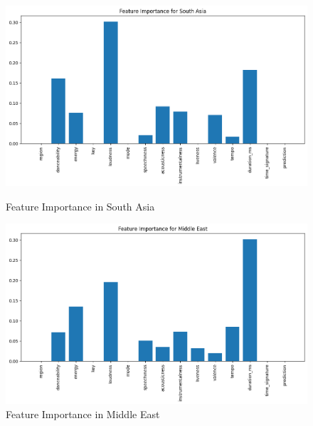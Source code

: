 \begin{figure}[h]
    \centering
    \begin{minipage}{0.45\textwidth}
        \centering
        \includegraphics[width=\linewidth]{media/dt_feat_imp_south_asia.png}
        \caption{Feature Importance in South Asia}
    \end{minipage}%
    \hspace{0.05\textwidth} %
    \begin{minipage}{0.45\textwidth}
        \centering
        \includegraphics[width=\linewidth]{media/dt_feat_imp_middle_east.png}
        \caption{Feature Importance in Middle East}
    \end{minipage}
\end{figure}

